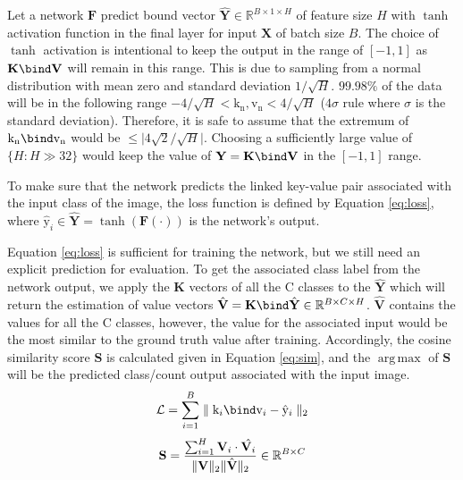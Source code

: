 \documentclass[letterpaper]{article} %
\DeclarePairedDelimiter{\norm}{\lVert}{\rVert}
\DeclareMathOperator*{\argmax}{arg\,max}
\begin{document}
Let a network $\mathbf{F}$ predict bound vector $\hat{\mathbf{Y}} \in \mathbb{R}^{B \times 1 \times H}$ of feature size $H$ with $\tanh$ activation function in the final layer for input $\mathbf{X}$ of batch size $B$. The choice of $\tanh$ activation is intentional to keep the output in the range of $[-1, 1]$ as $\mathbf{K} \bind \mathbf{V}$ will remain in this range. This is due to sampling from a normal distribution with mean zero and standard deviation $1/\sqrt{H}$. $99.98\%$ of the data will be in the following range $-4/\sqrt{H} < \mathrm{k}_\mathrm{n}, \mathrm{v}_\mathrm{n} < 4/\sqrt{H}$ ($4\sigma$ rule where $\sigma$ is the standard deviation). Therefore, it is safe to assume that the extremum of $\mathrm{k}_\mathrm{n} \bind \mathrm{v}_\mathrm{n}$ would be $\leq \lvert 4\sqrt{2}/\sqrt{H} \rvert$. Choosing a sufficiently large value of $\{H:H\gg32\}$ would keep the value of $\mathbf{Y}=\mathbf{K} \bind \mathbf{V}$ in the $[-1, 1]$ range.
\par
To make sure that the network predicts the linked key-value pair associated with the input class of the image, the loss function is defined by Equation \ref{eq:loss}, where $\hat{\mathrm{y}}_i \in \hat{\mathbf{Y}} = \tanh(\mathbf{F}(\cdot))$ is the network's output.

Equation \ref{eq:loss} is sufficient for training the network, but we still need an explicit prediction for evaluation. To get the associated class label from the network output, we apply the $\mathbf{K}$ vectors of all the $\mathrm{C}$ classes to the $\hat{\mathbf{Y}}$ which will return the estimation of value vectors
$\hat{\mathbf{V}} = \mathbf{K} \bind \hat{\mathbf{Y}} \in \mathbb{R}^{B \times C \times H}$.
$\hat{\mathbf{V}}$ contains the values for all the $\mathrm{C}$ classes, however, the value for the associated input would be the most similar to the ground truth value after training. Accordingly, the cosine similarity score $\mathbf{S}$ is calculated given in Equation \ref{eq:sim}, and the $\argmax$ of $\mathbf{S}$ will be the predicted class/count output associated with the input image.
\begin{equation}
\mathcal{L} = \sum_{i=1}^{B} \; \norm{\; \mathrm{k}_i \bind \mathrm{v}_i - \hat{\mathrm{y}}_i \;}_2
\label{eq:loss}
\end{equation}
\begin{equation}
\mathbf{S} = \frac{\sum_{i=1}^{H} \mathbf{V}_{i} \cdot \hat{\mathbf{V}_{i}}}{\norm{\mathbf{V}}_2 \norm{\hat{\mathbf{V}}}_2} \in \mathbb{R}^{B \times C}
\label{eq:sim}
\end{equation}
\end{document}
